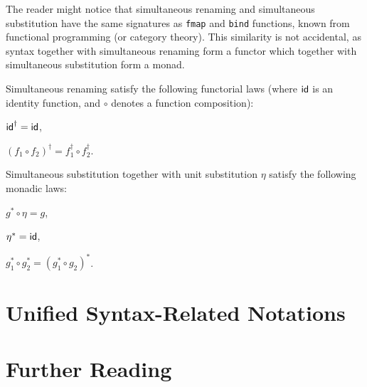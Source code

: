 The reader might notice that simultaneous renaming
and simultaneous substitution
have the same signatures as \texttt{fmap} and \texttt{bind}
functions, known from functional programming (or category theory).
This similarity is not accidental,
as syntax together with simultaneous renaming form a functor
which together with simultaneous substitution form a monad.

\begin{lemma}
  Simultaneous renaming satisfy the following functorial laws
  (where $\mathsf{id}$ is an identity function,
  and $\circ$ denotes a function composition):
  \begin{thmenumerate}
  \item $\mathsf{id}^\dagger = \mathsf{id}$,
  \item $(f_1\circ f_2)^\dagger = f_1^\dagger \circ f_2^\dagger$.
  \end{thmenumerate}
\end{lemma}

\begin{lemma}
  Simultaneous substitution together with unit substitution $\eta$
  satisfy the following monadic laws:
  \begin{thmenumerate}
  \item $g^* \circ \eta = g$,
  \item $\eta^* = \mathsf{id}$,
  \item $g_1^* \circ g_2^* = (g_1^* \circ g_2)^*$.
  \end{thmenumerate}
\end{lemma}

\section{Unified Syntax-Related Notations}

\section{Further Reading}
